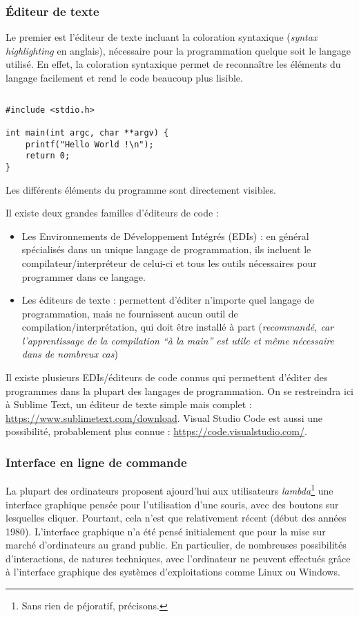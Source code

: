 \documentclass[../../main.tex]{subfiles}
\begin{document}
\subsubsection{Éditeur de texte}\label{ssub:_diteur_de_texte}
Le premier est l'éditeur de texte incluant la coloration syntaxique (\textit{syntax highlighting} en anglais), nécessaire pour la programmation quelque soit le langage utilisé. En effet, la coloration syntaxique permet de reconnaître les éléments du langage facilement et rend le code beaucoup plus lisible.
\begin{lstlisting}[title=Un premier programme]
\end{lstlisting}
\begin{verbatim}
#include <stdio.h>

int main(int argc, char **argv) {
	printf("Hello World !\n");
	return 0;
}
\end{verbatim}
Les différents éléments du programme sont directement visibles.

Il existe deux grandes familles d'éditeurs de code :
\begin{itemize}
	\item Les Environnements de Développement Intégrés (EDIs) : en général spécialisés dans un unique langage de programmation, ils incluent le compilateur/interpréteur de celui-ci et tous les outils nécessaires pour programmer dans ce langage.
	\item Les éditeurs de texte : permettent d'éditer n'importe quel langage de programmation, mais ne fournissent aucun outil de compilation/interprétation, qui doit être installé à part (\textit{recommandé, car l'apprentissage de la compilation ``à la main'' est utile et même nécessaire dans de nombreux cas})
\end{itemize}
Il existe plusieurs EDIs/éditeurs de code connus qui permettent d'éditer des programmes dans la plupart des langages de programmation. On se restreindra ici à Sublime Text, un éditeur de texte simple mais complet : \url{https://www.sublimetext.com/download}. Visual Studio Code est aussi une possibilité, probablement plus connue : \url{https://code.visualstudio.com/}.
\subsubsection{Interface en ligne de commande} \label{ssub:interface_en_ligne_de_commande}
La plupart des ordinateurs proposent ajourd'hui aux utilisateurs \textit{lambda}\footnote{Sans rien de péjoratif, précisons.} une interface graphique pensée pour l'utilisation d'une souris, avec des boutons sur lesquelles cliquer. Pourtant, cela n'est que relativement récent (début des années 1980). L'interface graphique n'a été pensé initialement que pour la mise sur marché d'ordinateurs au grand public. En particulier, de nombreuses possibilités d'interactions, de natures techniques, avec l'ordinateur ne peuvent effectués grâce à l'interface graphique des systèmes d'exploitations comme Linux ou Windows.
\end{document}
